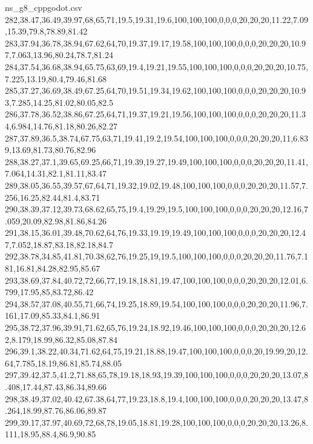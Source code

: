 \begin{filecontents*}[overwrite]{ns_g8_cppgodot.csv}
282,38.47,36.49,39.97,68,65,71,19.5,19.31,19.6,100,100,100,0,0,0,20,20,20,11.22,7.09,15.39,79.8,78.89,81.42
283,37.94,36.78,38.94,67.62,64,70,19.37,19.17,19.58,100,100,100,0,0,0,20,20,20,10.97,7.063,13.96,80.24,78.7,81.24
284,37.54,36.68,38.94,65.75,63,69,19.4,19.21,19.55,100,100,100,0,0,0,20,20,20,10.75,7.225,13.19,80.4,79.46,81.68
285,37.27,36.69,38.49,67.25,64,70,19.51,19.34,19.62,100,100,100,0,0,0,20,20,20,10.93,7.285,14.25,81.02,80.05,82.5
286,37.78,36.52,38.86,67.25,64,71,19.37,19.21,19.56,100,100,100,0,0,0,20,20,20,11.34,6.984,14.76,81.18,80.26,82.27
287,37.89,36.5,38.74,67.75,63,71,19.41,19.2,19.54,100,100,100,0,0,0,20,20,20,11,6.839,13.69,81.73,80.76,82.96
288,38.27,37.1,39.65,69.25,66,71,19.39,19.27,19.49,100,100,100,0,0,0,20,20,20,11.41,7.064,14.31,82.1,81.11,83.47
289,38.05,36.55,39.57,67,64,71,19.32,19.02,19.48,100,100,100,0,0,0,20,20,20,11.57,7.256,16.25,82.44,81.4,83.71
290,38.39,37.12,39.73,68.62,65,75,19.4,19.29,19.5,100,100,100,0,0,0,20,20,20,12.16,7.059,20.09,82.98,81.86,84.26
291,38.15,36.01,39.48,70.62,64,76,19.33,19.19,19.49,100,100,100,0,0,0,20,20,20,12.47,7.052,18.87,83.18,82.18,84.7
292,38.78,34.85,41.81,70.38,62,76,19.25,19,19.5,100,100,100,0,0,0,20,20,20,11.76,7.181,16.81,84.28,82.95,85.67
293,38.69,37.84,40.72,72,66,77,19.18,18.81,19.47,100,100,100,0,0,0,20,20,20,12.01,6.799,17.95,85,83.72,86.42
294,38.57,37.08,40.55,71,66,74,19.25,18.89,19.54,100,100,100,0,0,0,20,20,20,11.96,7.161,17.09,85.33,84.1,86.91
295,38.72,37.96,39.91,71.62,65,76,19.24,18.92,19.46,100,100,100,0,0,0,20,20,20,12.62,8.179,18.99,86.32,85.08,87.84
296,39.1,38.22,40.34,71.62,64,75,19.21,18.88,19.47,100,100,100,0,0,0,20,19.99,20,12.64,7.785,18.19,86.81,85.74,88.05
297,39.42,37.5,41.2,71.88,65,78,19.18,18.93,19.39,100,100,100,0,0,0,20,20,20,13.07,8.408,17.44,87.43,86.34,89.66
298,38.49,37.02,40.42,67.38,64,77,19.23,18.8,19.4,100,100,100,0,0,0,20,20,20,13.47,8.264,18.99,87.76,86.06,89.87
299,39.17,37.97,40.69,72,68,78,19.05,18.81,19.28,100,100,100,0,0,0,20,20,20,13.26,8.111,18.95,88.4,86.9,90.85
\end{filecontents*}

